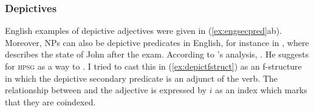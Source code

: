 \subsubsection{Depictives}
\label{subsubsec:depict}

English examples of depictive adjectives were given in (\ref{ex:engsecpred}ab).
Moreover, NPs can also be depictive predicates in English, for instance in 
, where 
describes the state of John after the exam. According to \citet{mueller2002}'s
analysis, . He suggests for \textsc{hpsg}  as a way to . I tried to cast this in
(\ref{ex:depictfstruct}) as an f-structure in which the depictive secondary
predicate is an adjunct of the verb. The relationship between \Subj{} and the
adjective is expressed by $i$ as an index which marks that they are coindexed.

